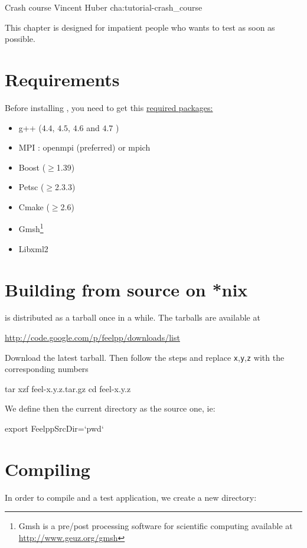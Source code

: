             {Crash course}
            {Vincent Huber}
            {cha:tutorial-crash\_course}

This chapter is designed for impatient people who wants to test \feel as soon as possible.
\section{Requirements}
Before installing \feel, you need to get this \underline{required packages:}\\
\begin{itemize}
\item g++ ($4.4$, $4.5$, $4.6$ and $4.7$  )
\item MPI : openmpi (preferred) or mpich
\item Boost ($\geq$1.39)
\item Petsc ($\geq$2.3.3)
\item Cmake ($\geq$2.6)
\item Gmsh\footnote{Gmsh is a pre/post processing software for scientific
computing available at \url{http://www.geuz.org/gmsh}}
\item Libxml2
\end{itemize}

\section{Building \feel from source on *nix}
\feel is distributed as a tarball once in a while. The tarballs are available
at
\begin{center}
  \href{http://code.google.com/p/feelpp/downloads/list}{http://code.google.com/p/feelpp/downloads/list}
\end{center}
Download the latest tarball. Then follow the steps and replace
\texttt{x},\texttt{y},\texttt{z} with the corresponding numbers

\begin{unixcom}
  tar xzf feel-x.y.z.tar.gz
  cd feel-x.y.z
\end{unixcom}
We define then the current directory as the source one, ie:
\begin{unixcom}
  export FeelppSrcDir=`pwd`
\end{unixcom}

\section{Compiling}
In order to compile \feel and a test application, we create a new directory:

